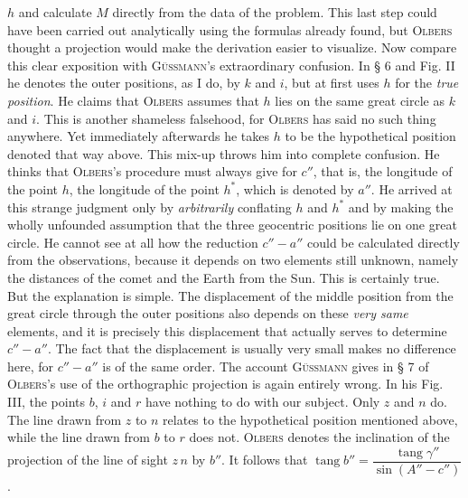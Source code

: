 $h$ and calculate $M$ directly from the data of the problem. This last step could have been carried out analytically using the formulas already found, but \textsc{Olbers} thought a projection would make the derivation easier to visualize. Now compare this clear exposition with \textsc{Güssmann}’s extraordinary confusion. In § 6 and Fig. II he denotes the outer positions, as I do, by $k$ and $i$, but at first uses $h$ for the \emph{true position}. He claims that \textsc{Olbers} assumes that $h$ lies on the same great circle as $k$ and $i$. This is another shameless falsehood, for \textsc{Olbers} has said no such thing anywhere. Yet immediately afterwards he takes $h$ to be the hypothetical position denoted that way above. This mix-up throws him into complete confusion. He thinks that \textsc{Olbers}’s procedure must always give for $c''$, that is, the longitude of the point $h$, the longitude of the point $h^*$, which is denoted by $a''$. He arrived at this strange judgment only by \emph{arbitrarily} conflating $h$ and $h^*$ and by making the wholly unfounded assumption that the three geocentric positions lie on one great circle. He cannot see at all how the reduction $c''-a''$ could be calculated directly from the observations, because it depends on two elements still unknown, namely the distances of the comet and the Earth from the Sun. This is certainly true. But the explanation is simple. The displacement of the middle position from the great circle through the outer positions also depends on these \emph{very same} elements, and it is precisely this displacement that actually serves to determine $c''-a''$. The fact that the displacement is usually very small makes no difference here, for $c''-a''$ is of the same order. The account \textsc{Güssmann} gives in § 7 of \textsc{Olbers}’s use of the orthographic projection is again entirely wrong. In his Fig. III, the points $b$, $i$ and $r$ have nothing to do with our subject. Only $z$ and $n$ do. The line drawn from $z$ to $n$ relates to the hypothetical position mentioned above, while the line drawn from $b$ to $r$ does not. \textsc{Olbers} denotes the inclination of the projection of the line of sight $z\,n$ by $b''$. It follows that
$\operatorname{tang} b'' = \dfrac{\operatorname{tang} \gamma''}{\sin(A''-c'')}$.
